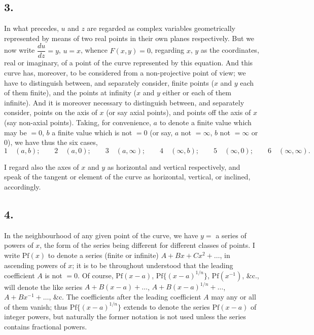 \documentclass[11pt,a4paper]{book}
\providecommand{\Pf}{\mathrm{Pf}}
\begin{document}
\subsection*{3.}

In what precedes, $u$ and $z$ are regarded as complex variables geometrically represented by means of two real points in their own planes respectively. But we now write $\dfrac{du}{dz} = y$, $u = x$, whence $F(x, y) = 0$, regarding $x$, $y$ as the coordinates, real or imaginary, of a point of the curve represented by this equation. And this curve has, moreover, to be considered from a non-projective point of view; we have to distinguish between, and separately consider, finite points ($x$ and $y$ each of them finite), and the points at infinity ($x$ and $y$ either or each of them infinite). And it is moreover necessary to distinguish between, and separately consider, points on the axis of $x$ (or say axial points), and points off the axis of $x$ (say non-axial points). Taking, for convenience, $a$ to denote a finite value which may be $= 0$, $b$ a finite value which is not $= 0$ (or say, $a$ not $= \infty$, $b$ not $= \infty$ or $0$), we have thus the six cases,
\[
1\quad (a, b); \qquad 2\quad (a, 0); \qquad 3\quad (a, \infty); \qquad 4\quad (\infty, b); \qquad 5\quad (\infty, 0); \qquad 6\quad (\infty, \infty).
\]

I regard also the axes of $x$ and $y$ as horizontal and vertical respectively, and speak of the tangent or element of the curve as horizontal, vertical, or inclined, accordingly.

\subsection*{4.}

In the neighbourhood of any given point of the curve, we have $y =$ a series of powers of $x$, the form of the series being different for different classes of points. I write $\Pf(x)$ to denote a series (finite or infinite) $A + Bx + Cx^2 + \ldots$, in ascending powers of $x$; it is to be throughout understood that the leading coefficient $A$ is not $= 0$. Of course, $\Pf(x-a)$, $\Pf\{(x-a)^{1/n}\}$, $\Pf(x^{-1})$, \&c., will denote the like series $A + B(x - a) + \ldots$, $A + B(x - a)^{1/n} + \ldots$, $A + Bx^{-1} + \ldots$, \&c. The coefficients after the leading coefficient $A$ may any or all of them vanish; thus $\Pf\{(x - a)^{1/n}\}$ extends to denote the series $\Pf(x - a)$ of integer powers, but naturally the former notation is not used unless the series contains fractional powers.
\end{document}
